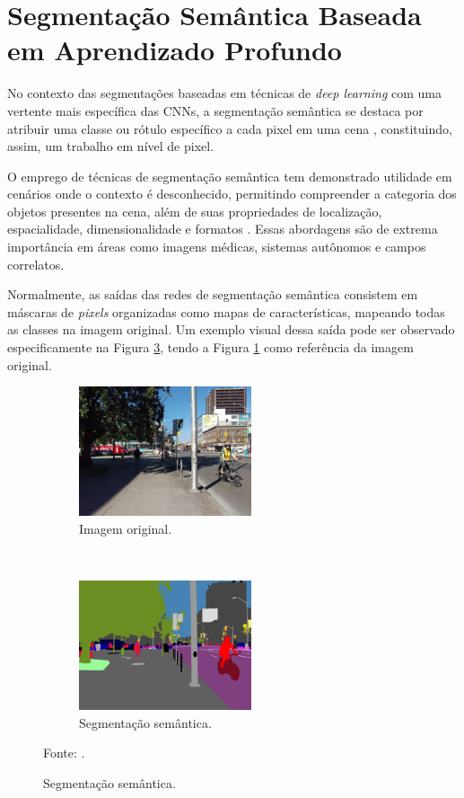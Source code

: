 \clearpage
\newpage


\section{Segmentação Semântica Baseada em Aprendizado Profundo}
\label{semantic}
No contexto das segmentações baseadas em técnicas de \textit{deep learning} com uma vertente mais específica das CNNs, a segmentação semântica se destaca por atribuir uma classe ou rótulo específico a cada pixel em uma cena \citep{Wang2017, Ghosh2019, Shelhamer2016, Arbelaez2012, Zhang2018}, constituindo, assim, um trabalho em nível de pixel.

O emprego de técnicas de segmentação semântica tem demonstrado utilidade em cenários onde o contexto é desconhecido, permitindo compreender a categoria dos objetos presentes na cena, além de suas propriedades de localização, espacialidade, dimensionalidade e formatos \citep{Zhang2018}. Essas abordagens são de extrema importância em áreas como imagens médicas, sistemas autônomos e campos correlatos.

Normalmente, as saídas das redes de segmentação semântica consistem em máscaras de \textit{pixels} organizadas como mapas de características, mapeando todas as classes na imagem original. Um exemplo visual dessa saída pode ser observado especificamente na Figura \ref{semantic:fig:3.2}, tendo a Figura \ref{semantic:fig:3.1} como referência da imagem original.

\begin{figure}[H]
   \caption{Segmentação semântica.}
   \centering
   \label{semantic:fig:3}
    \begin{subfigure}[t]{0.45\textwidth}
        \centering
        \includegraphics[height=1.5in]{recursos/imagens/semantic/t1.jpg}
        \caption{Imagem original.}
        \label{semantic:fig:3.1}
    \end{subfigure}%
    ~ 
    \begin{subfigure}[t]{0.45\textwidth}
        \centering
        \includegraphics[height=1.5in]{recursos/imagens/semantic/s1.png}
        \caption{Segmentação semântica.}
        \label{semantic:fig:3.2}
    \end{subfigure}%

    Fonte: \cite{Neuhold2017_ICCV}.
\end{figure}

